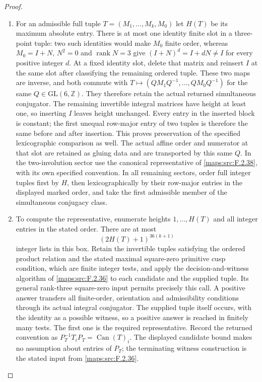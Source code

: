 \documentclass[11pt,a4paper]{article}
\theoremstyle{definition}
\begin{document}
\begin{proof}
\begin{enumerate}[label=\arabic*.]
\item For an admissible full tuple $T=(M_1,\ldots,M_k,M_0)$ let
$H(T)$ be its maximum absolute entry. There is at most one identity
finite slot in a three-point tuple: two such identities would make
$M_0$ finite order, whereas $M_0=I+N$, $N^2=0$ and
$\operatorname{rank}N=3$ give $(I+N)^d=I+dN\ne I$ for every
positive integer $d$. At a fixed identity slot, delete that matrix
and reinsert $I$ at the same slot after classifying the remaining
ordered tuple. These two maps are inverse, and both commute with
$T\mapsto (QM_1Q^{-1},\ldots,QM_0Q^{-1})$ for the same
$Q\in\mathrm{GL}(6,\mathbb Z)$. They therefore retain the actual
returned simultaneous conjugator. The remaining invertible integral
matrices have height at least one, so inserting $I$ leaves height
unchanged. Every entry in the inserted block is constant; the first
unequal row-major entry of two tuples is therefore the same before
and after insertion. This proves preservation of the specified
lexicographic comparison as well. The actual affine order and
numerator at that slot are retained as gluing data and are transported
by this same $Q$. In the two-involution sector use the canonical
representative of \ref{maps:src:F.2.38}, with its own specified
convention. In all remaining sectors, order full integer tuples
first by $H$, then lexicographically by their row-major entries in
the displayed marked order, and take the first admissible member
of the simultaneous conjugacy class.

\item To compute the representative, enumerate heights
$1,\ldots,H(T)$ and all integer entries in the stated order.
There are at most
\[
 (2H(T)+1)^{36(k+1)}
 \tag{F.CN2}\label{maps:eq:F.CN2}
\]
integer lists in this box. Retain the invertible tuples satisfying
the ordered product relation and the stated maximal square-zero
primitive cusp condition, which are finite integer tests, and
apply the decision-and-witness algorithm of
\cref{maps:src:F.2.36} to each candidate and the supplied tuple.
Its general rank-three square-zero input permits precisely this
call. A positive answer transfers all finite-order, orientation
and admissibility conditions through its actual integral
conjugator. The supplied tuple itself occurs, with the identity
as a possible witness, so a positive answer is reached in
finitely many tests. The first one is the required representative.
Record the returned convention as
$P_T^{-1}T_iP_T=\operatorname{Can}(T)_i$.
The displayed candidate bound makes no assumption about entries
of $P_T$; the terminating witness construction is the stated
input from \cref{maps:src:F.2.36}.


\end{enumerate}
\end{proof}
\end{document}
